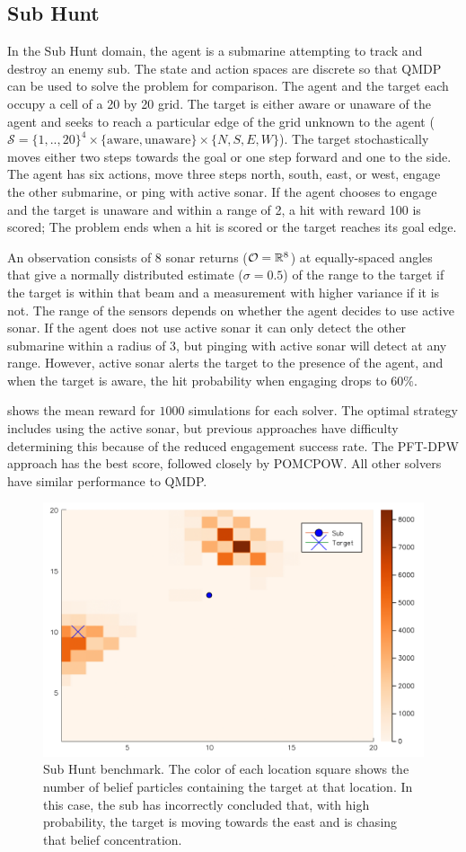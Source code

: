 \subsection{Sub Hunt}

In the Sub Hunt domain, the agent is a submarine attempting to track and destroy an enemy sub.
The state and action spaces are discrete so that QMDP can be used to solve the problem for comparison.
The agent and the target each occupy a cell of a 20 by 20 grid. The target is either aware or unaware of the agent and seeks to reach a particular edge of the grid unknown to the agent ($\mathcal{S} = \{1,..,20\}^4 \times \{\text{aware}, \text{unaware}\} \times \{N,S,E,W\}$).
The target stochastically moves either two steps towards the goal or one step forward and one to the side.
The agent has six actions, move three steps north, south, east, or west, engage the other submarine, or ping with active sonar.
If the agent chooses to engage and the target is unaware and within a range of 2, a hit with reward 100 is scored; The problem ends when a hit is scored or the target reaches its goal edge.

An observation consists of 8 sonar returns ($\mathcal{O} = \mathbb{R}^8$) at equally-spaced angles that give a normally distributed estimate ($\sigma=0.5$) of the range to the target if the target is within that beam and a measurement with higher variance if it is not.
The range of the sensors depends on whether the agent decides to use active sonar.
If the agent does not use active sonar it can only detect the other submarine within a radius of 3, but pinging with active sonar will detect at any range.
However, active sonar alerts the target to the presence of the agent, and when the target is aware, the hit probability when engaging drops to $60\%$.

 shows the mean reward for $1000$ simulations for each solver.
The optimal strategy includes using the active sonar, but previous approaches have difficulty determining this because of the reduced engagement success rate.
The PFT-DPW approach has the best score, followed closely by POMCPOW.
All other solvers have similar performance to QMDP.

\begin{figure}[htpb]
    \centering
    \includegraphics[width=0.6\linewidth]{media/subhunt.png}
    \caption[Sub Hunt problem]{Sub Hunt benchmark. The color of each location square shows the number of belief particles containing the target at that location. In this case, the sub has incorrectly concluded that, with high probability, the target is moving towards the east and is chasing that belief concentration.}
    \label{fig:subhunt}
\end{figure}



